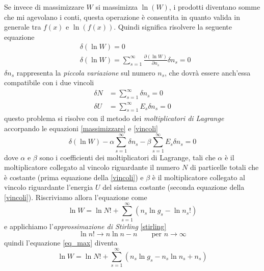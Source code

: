 Se invece di massimizzare $W$ si massimizza $\ln(W)$, i prodotti diventano somme che mi agevolano i conti, questa operazione è consentita in quanto valida in generale tra $f(x)$ e $\ln(f(x))$.
Quindi significa risolvere la seguente equazione
\begin{equation}
\begin{split}
& \delta (\ln W) = 0 \\
& \delta (\ln W) = \sum_{s=1}^{\infty} \frac{ \partial (\ln W)}{\partial n_s } \delta n_s = 0
\end{split}
\label{massimizzare}
\end{equation}
$\delta n_s$ rappresenta la \textit{piccola variazione} sul numero $n_s$, che dovrà essere anch'essa compatibile con i due vincoli
\begin{equation}
\begin{split}
\delta N & = \sum_{s=1}^{\infty} \delta n_s = 0 \\
\delta U & = \sum_{s=1}^{\infty} E_s \delta n_s = 0
\label{vincoli}
\end{split}
\end{equation}
questo problema si risolve con il metodo dei \textit{moltiplicatori di Lagrange} accorpando le equazioni \ref{massimizzare} e \ref{vincoli}
\begin{equation}
\delta (\ln W)   - \alpha  \sum_{s=1}^{\infty} \delta n_s   - \beta  \sum_{s=1}^{\infty} E_s \delta n_s  = 0
\label{molti_lag}
\end{equation}
dove $\alpha$ e $\beta$ sono i coefficienti dei moltiplicatori di Lagrange, tali che $\alpha$ è il moltiplicatore collegato al vincolo riguardante il numero $N$ di particelle totali che è costante (prima equazione della \ref{vincoli}) e $\beta$ è il moltiplicatore collegato al vincolo riguardante l'energia $U$ del sistema costante (seconda equazione della \ref{vincoli}).
Riscriviamo allora l'equazione come 
\begin{equation}
\ln W = \ln N! + \sum_{s=1}^{\infty} (n_s \ln g_s - \ln n_s !)
\label{eq_max}
\end{equation}
e applichiamo l'\textit{approssimazione di Stirling} \ref{stirling}
\begin{equation}
\ln n! \to n \ln n - n \quad\quad \mbox{per } n \to \infty
\label{stirling}
\end{equation}
quindi l'equazione \ref{eq_max} diventa
\begin{equation}
\ln W = \ln N! + \sum_{s=1}^{\infty} (n_s \ln g_s - n_s \ln n_s + n_s)
\end{equation}

